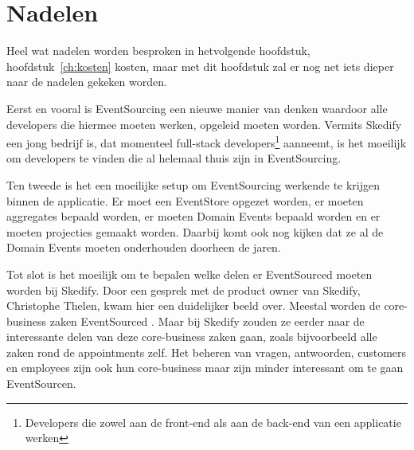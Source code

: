
\chapter{Nadelen}
\label{ch:nadelen}

Heel wat nadelen worden besproken in hetvolgende hoofdstuk, hoofdstuk~\ref{ch:kosten} kosten, maar met dit hoofdstuk zal er nog net iets dieper naar de nadelen gekeken worden.

Eerst en vooral is EventSourcing een nieuwe manier van denken waardoor alle developers die hiermee moeten werken, opgeleid moeten worden. Vermits Skedify een jong bedrijf is, dat momenteel full-stack developers\footnote{Developers die zowel aan de front-end als aan de back-end van een applicatie werken} aanneemt, is het moeilijk om developers te vinden die al helemaal thuis zijn in EventSourcing.

Ten tweede is het een moeilijke setup om EventSourcing werkende te krijgen binnen de applicatie. Er moet een EventStore opgezet worden, er moeten aggregates bepaald worden, er moeten Domain Events bepaald worden en er moeten projecties gemaakt worden. Daarbij komt ook nog kijken dat ze al de Domain Events moeten onderhouden doorheen de jaren.

Tot slot is het moeilijk om te bepalen welke delen er EventSourced moeten worden bij Skedify. Door een gesprek met de product owner van Skedify, Christophe Thelen, kwam hier een duidelijker beeld over. Meestal worden de core-business zaken EventSourced \autocite{Young2010WhyEventSourcing}. Maar bij Skedify zouden ze eerder naar de interessante delen van deze core-business zaken gaan, zoals bijvoorbeeld alle zaken rond de appointments zelf. Het beheren van vragen, antwoorden, customers en employees zijn ook hun core-business maar zijn minder interessant om te gaan EventSourcen.